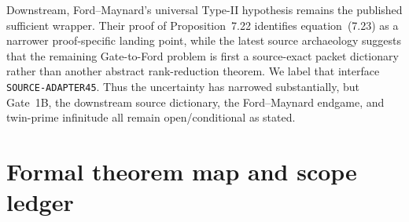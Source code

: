 \documentclass[11pt]{article}
\theoremstyle{definition}
\newcommand{\1}{\mathbf 1}
\begin{document}
Downstream, Ford--Maynard's universal Type-II hypothesis remains the published
sufficient wrapper.  Their proof of Proposition~7.22 identifies equation~(7.23)
as a narrower proof-specific landing point, while the latest source archaeology
suggests that the remaining Gate-to-Ford problem is first a source-exact packet
dictionary rather than another abstract rank-reduction theorem.  We label that
interface \texttt{SOURCE-ADAPTER45}.  Thus the uncertainty has narrowed
substantially, but Gate~1B, the downstream source dictionary, the Ford--Maynard
endgame, and twin-prime infinitude all remain open/conditional as stated.


\appendix
\section{Formal theorem map and scope ledger}
\label{app:formal-map}
\end{document}
